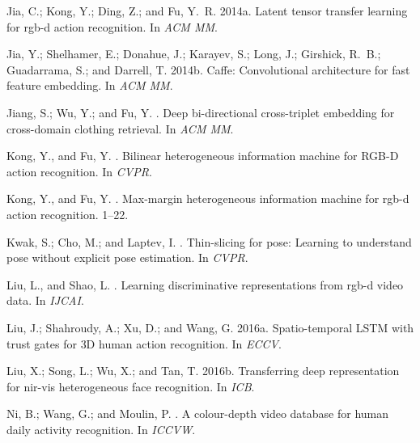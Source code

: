 \documentclass[letterpaper]{article} %
\begin{document}
\begin{thebibliography}{}
Jia, C.; Kong, Y.; Ding, Z.; and Fu, Y.~R.
\newblock 2014a.
\newblock Latent tensor transfer learning for rgb-d action recognition.
\newblock In {\em ACM MM}.

Jia, Y.; Shelhamer, E.; Donahue, J.; Karayev, S.; Long, J.; Girshick, R.~B.;
  Guadarrama, S.; and Darrell, T.
\newblock 2014b.
\newblock Caffe: Convolutional architecture for fast feature embedding.
\newblock In {\em ACM MM}.

Jiang, S.; Wu, Y.; and Fu, Y.
.
\newblock Deep bi-directional cross-triplet embedding for cross-domain clothing
  retrieval.
\newblock In {\em ACM MM}.

Kong, Y., and Fu, Y.
.
\newblock Bilinear heterogeneous information machine for {RGB-D} action
  recognition.
\newblock In {\em CVPR}.

Kong, Y., and Fu, Y.
.
\newblock Max-margin heterogeneous information machine for rgb-d action
  recognition.
  1--22.

Kwak, S.; Cho, M.; and Laptev, I.
.
\newblock Thin-slicing for pose: Learning to understand pose without explicit
  pose estimation.
\newblock In {\em CVPR}.

Liu, L., and Shao, L.
.
\newblock Learning discriminative representations from rgb-d video data.
\newblock In {\em IJCAI}.

Liu, J.; Shahroudy, A.; Xu, D.; and Wang, G.
\newblock 2016a.
\newblock Spatio-temporal {LSTM} with trust gates for {3D} human action
  recognition.
\newblock In {\em ECCV}.

Liu, X.; Song, L.; Wu, X.; and Tan, T.
\newblock 2016b.
\newblock Transferring deep representation for nir-vis heterogeneous face
  recognition.
\newblock In {\em ICB}.

Ni, B.; Wang, G.; and Moulin, P.
.
\newblock A colour-depth video database for human daily activity recognition.
\newblock In {\em ICCVW}.


\end{thebibliography}
\end{document}
